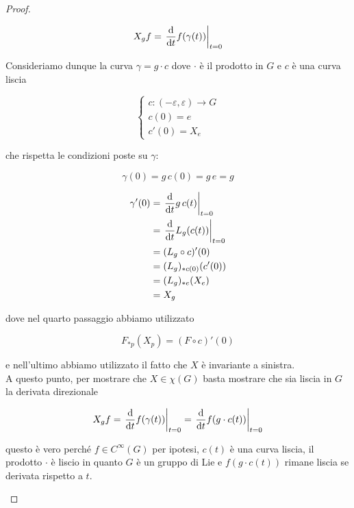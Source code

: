 \begin{proof}
\begin{enumerate}
		\begin{equation}
			X_{g} f = \eval{ \dv{t} f(\gamma(t)) }_{t=0}
		\end{equation}
	
		Consideriamo dunque la curva $ \gamma = g \cdot c $ dove $ \cdot $ è il prodotto in $ G $ e $ c $ è una curva liscia
		
		\begin{equation}
			\begin{cases}
				c : (-\varepsilon,\varepsilon) \to G \\
				c(0) = e \\
				c'(0) = X_{e}
			\end{cases}
		\end{equation}
	
		che rispetta le condizioni poste su $ \gamma $:
		
		\begin{equation}
			\gamma(0) = g \, c(0)= g \, e = g
		\end{equation}
	
		\begin{align}
			\begin{split}
				\gamma'(0) &= \eval{ \dv{t} g \, c(t) }_{t=0} \\
				&= \eval{ \dv{t} L_{g}(c(t)) }_{t=0} \\
				&= (L_{g} \circ c)'(0) \\
				&= (L_{g})_{*c(0)} (c'(0)) \\
				&= (L_{g})_{*e} (X_{e}) \\
				&= X_{g}
			\end{split}
		\end{align}
	
		dove nel quarto passaggio abbiamo utilizzato
		
		\begin{equation}
			F_{*p}(X_{p}) = (F \circ c)'(0)
		\end{equation}
		
		e nell'ultimo abbiamo utilizzato il fatto che $ X $ è invariante a sinistra.\\
		A questo punto, per mostrare che $ X \in \chi(G) $ basta mostrare che sia liscia in $ G $ la derivata direzionale
		
		\begin{equation}
			X_{g} f = \eval{ \dv{t} f(\gamma(t)) }_{t=0} %
			= \eval{ \dv{t} f(g \cdot c(t)) }_{t=0}
		\end{equation}
	
		questo è vero perché $ f \in C^{\infty}(G) $ per ipotesi, $ c(t) $ è una curva liscia, il prodotto $ \cdot $ è liscio in quanto $ G $ è un gruppo di Lie e $ f(g \cdot c(t)) $ rimane liscia se derivata rispetto a $ t $.
		

\end{enumerate}
\end{proof}
